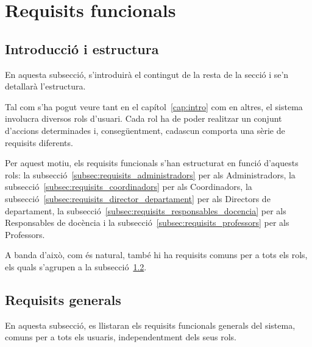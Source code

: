 \documentclass[a4paper,12pt]{ThesisStyle}
\begin{document}
\section{Requisits funcionals}
\label{sec:requisits_funcionals}

\subsection{Introducció i estructura}
\label{subsec:requisits_funcionals_intro}

En aquesta subsecció, s'introduirà el contingut de la resta de la secció i se'n detallarà l'estructura.

Tal com s'ha pogut veure tant en el capítol~\ref{cap:intro} com en altres, el sistema involucra diversos rols d'usuari. Cada rol ha de poder realitzar un conjunt d'accions determinades i, consegüentment, cadascun comporta una sèrie de requisits diferents.

Per aquest motiu, els requisits funcionals s'han estructurat en funció d'aquests rols: la subsecció~\ref{subsec:requisits_administradors} per als Administradors, la subsecció~\ref{subsec:requisits_coordinadors} per als Coordinadors, la subsecció~\ref{subsec:requisits_director_departament} per als Directors de departament, la subsecció~\ref{subsec:requisits_responsables_docencia} per als Responsables de docència i la subsecció~\ref{subsec:requisits_professors} per als Professors.

A banda d'això, com és natural, també hi ha requisits comuns per a tots els rols, els quals s'agrupen a la subsecció~\ref{subsec:requisits_generals}.

\subsection{Requisits generals}
\label{subsec:requisits_generals}

En aquesta subsecció, es llistaran els requisits funcionals generals del sistema, comuns per a tots els usuaris, independentment dels seus rols.
\end{document}
